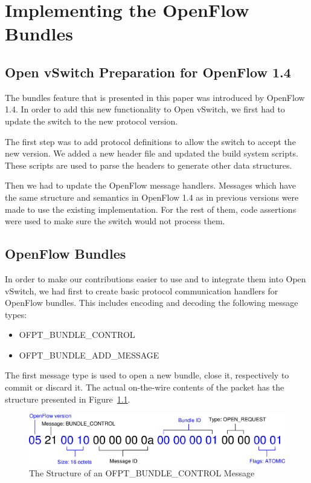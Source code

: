 \chapter{Implementing the OpenFlow Bundles}
\label{chapter:impl}  
 
\section{Open vSwitch Preparation for OpenFlow 1.4}

The bundles feature that is presented in this paper was introduced by OpenFlow 1.4. In order to add
this new functionality to Open vSwitch, we first had to update the switch to the new protocol version.

The first step was to add protocol definitions to allow the switch to accept the new version. We added
a new header file and updated the build system scripts. These scripts are used to parse the headers
to generate other data structures.

Then we had to update the OpenFlow message handlers. Messages which have the same structure and semantics
in OpenFlow 1.4 as in previous versions were made to use the existing implementation. For the rest of
them, code assertions were used to make sure the switch would not process them.

\section{OpenFlow Bundles}

In order to make our contributions easier to use and to integrate them into Open vSwitch,
we had first to create basic protocol communication handlers for OpenFlow bundles. This
includes encoding and decoding the following message types:
\begin{itemize}
 \item OFPT_BUNDLE_CONTROL
 \item OFPT_BUNDLE_ADD_MESSAGE
\end{itemize}
The first message type is used to open a new bundle, close it, respectively to commit or discard it. The
actual on-the-wire contents of the packet has the structure presented in Figure~\ref{fig:bundle-open-bytes}.

\begin{figure}[h]
\begin{center}
\includegraphics[scale=0.6]{src/img/bundle-open-message-bytes.eps}
\end{center}
\caption{The Structure of an OFPT_BUNDLE_CONTROL Message}
\label{fig:bundle-open-bytes}
\end{figure}

